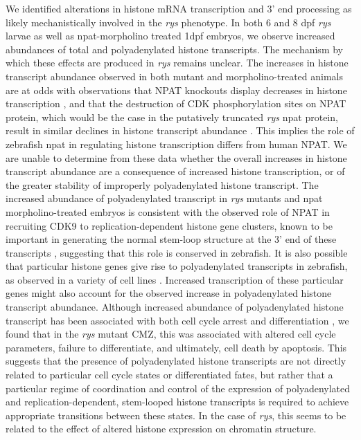 We identified alterations in histone mRNA transcription and 3’ end processing as likely mechanistically involved in the \textit{rys} phenotype. In both 6 and 8 dpf \textit{rys} larvae as well as npat-morpholino treated 1dpf embryos, we observe increased abundances of total and polyadenylated histone transcripts. The mechanism by which these effects are produced in \textit{rys} remains unclear. The increases in histone transcript abundance observed in both mutant and morpholino-treated animals are at odds with observations that NPAT knockouts display decreases in histone transcription \cite{Ye2003}, and that the destruction of CDK phosphorylation sites on NPAT protein, which would be the case in the putatively truncated \textit{rys} npat protein, result in similar declines in histone transcript abundance \cite{Ma2000,Mitra2009}. This implies the role of zebrafish npat in regulating histone transcription differs from human NPAT. We are unable to determine from these data whether the overall increases in histone transcript abundance are a consequence of increased histone transcription, or of the greater stability of improperly polyadenylated histone transcript. The increased abundance of polyadenylated transcript in \textit{rys} mutants and npat morpholino-treated embryos is consistent with the observed role of NPAT in recruiting CDK9 to replication-dependent histone gene clusters, known to be important in generating the normal stem-loop structure at the 3’ end of these transcripts \cite{Pirngruber2009}, suggesting that this role is conserved in zebrafish. It is also possible that particular histone genes give rise to polyadenylated transcripts in zebrafish, as observed in a variety of cell lines \cite{Kari2013}. Increased transcription of these particular genes might also account for the observed increase in polyadenylated histone transcript abundance. Although increased abundance of polyadenylated histone transcript has been associated with both cell cycle arrest and differentiation \cite{Kari2013}, we found that in the \textit{rys} mutant CMZ, this was associated with altered cell cycle parameters, failure to differentiate, and ultimately, cell death by apoptosis. This suggests that the presence of polyadenylated histone transcripts are not directly related to particular cell cycle states or differentiated fates, but rather that a particular regime of coordination and control of the expression of polyadenylated and replication-dependent, stem-looped histone transcripts is required to achieve appropriate transitions between these states. In the case of \textit{rys}, this seems to be related to the effect of altered histone expression on chromatin structure.
